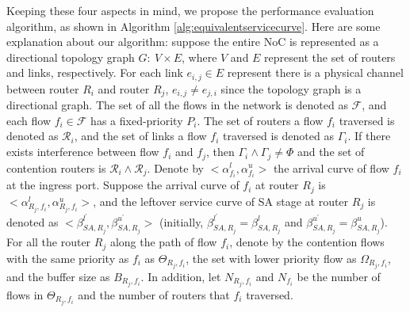 \documentclass[10pt,journal]{IEEEtran}
\begin{document}
Keeping these four aspects in mind, we propose the performance evaluation algorithm, as shown in Algorithm \ref{alg:equivalentservicecurve}. Here are some explanation about our algorithm: suppose the entire NoC is represented as a directional topology graph $G:\ V\times E$, where $V$ and $E$ represent the set of routers and links, respectively. For each link $e_{i,j}\in E$ represent there is a physical channel between router $R_i$ and router $R_j$, $e_{i,j}\neq e_{j,i}$ since the topology graph is a directional graph. The set of all the flows in the network is denoted as $\mathcal{F}$, and each flow $f_i\in\mathcal{F}$ has a fixed-priority $P_i$. The set of routers a flow $f_i$ traversed is denoted as $\mathcal{R}_i$, and the set of links a flow $f_i$ traversed is denoted as $\Gamma_i$. If there exists interference between flow $f_i$ and $f_j$, then $\Gamma_i\wedge\Gamma_j\neq\Phi$ and the set of contention routers is $\mathcal{R}_i\wedge\mathcal{R}_j$. Denote by $<\alpha_{f_i}^l,\alpha_{f_i}^u>$ the arrival curve of flow $f_i$ at the ingress port. Suppose the arrival curve of $f_i$ at router $R_j$ is $<\alpha_{R_j,f_i}^l,\alpha_{R_j,f_i}^u>$, and the leftover service curve of SA stage at router $R_j$ is denoted as $<\beta_{SA,R_j}^{l^\prime},\beta_{SA,R_j}^{u^\prime}>$ (initially, $\beta_{SA,R_j}^{l^\prime}=\beta_{SA,R_j}^{l}$ and $\beta_{SA,R_j}^{u^\prime}=\beta_{SA,R_j}^{u}$). For all the router $R_j$ along the path of flow $f_i$, denote by the contention flows with the same priority as $f_i$ as $\Theta_{R_j,f_i}$, the set with lower priority flow as $\Omega_{R_j,f_i}$, and the buffer size as $B_{R_j,f_i}$. In addition, let $N_{R_j,f_i}$ and $N_{f_i}$ be the number of flows in $\Theta_{R_j,f_i}$ and the number of routers that $f_i$ traversed.
\end{document}
